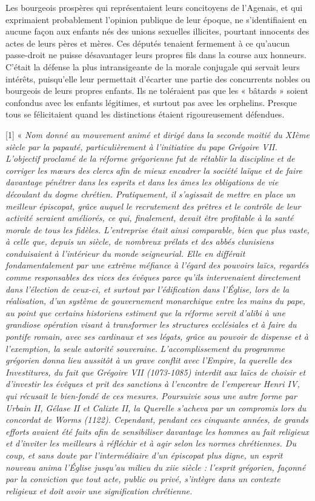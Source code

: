  Les bourgeois prospères qui représentaient leurs concitoyens de l'Agenais, et qui exprimaient probablement l'opinion publique de leur époque, ne s'identifiaient en aucune façon aux enfants nés des unions sexuelles illicites, pourtant innocents des actes de leurs pères et mères. Ces députés tenaient fermement à ce qu'aucun passe-droit ne puisse désavantager leurs propres fils dans la course aux honneurs. C'était la défense la plus intransigeante de la morale conjugale qui servait leurs intérêts, puisqu'elle leur permettait d'écarter une partie des concurrents nobles ou bourgeois de leurs propres enfants. Ils ne toléraient pas que les « bâtards » soient confondus avec les enfants légitimes, et surtout pas avec les orphelins. Presque tous se félicitaient quand les distinctions étaient rigoureusement défendues. 
 
[1] « \emph{Nom donné au mouvement animé et dirigé dans la seconde moitié du XIème siècle par la papauté, particulièrement à l'initiative du pape Grégoire VII. L'objectif proclamé de la réforme grégorienne fut de rétablir la discipline} \emph{et de corriger les mœurs des clercs} \emph{afin de} \emph{mieux encadrer la société laïque et de faire davantage pénétrer dans les esprits et dans les âmes les obligations de vie découlant du dogme chrétien. Pratiquement, il s'agissait de mettre en place un meilleur épiscopat, grâce auquel le recrutement des prêtres et le contrôle de leur activité seraient améliorés, ce qui, finalement, devait être profitable à la santé morale de tous les fidèles. L'entreprise était ainsi comparable, bien que plus vaste, à celle que, depuis un siècle, de nombreux prélats et des abbés clunisiens conduisaient à l'intérieur du monde seigneurial. Elle en différait fondamentalement par une extrême méfiance à l'égard des pouvoirs laïcs, regardés comme responsables des vices des évêques parce qu'ils intervenaient directement dans l'élection de ceux-ci, et surtout par l'édification dans l'Église, lors de la réalisation, d'un système de gouvernement monarchique entre les mains du pape, au point que certains historiens estiment que la réforme servit d'alibi à une grandiose opération visant à transformer les structures ecclésiales et à faire du pontife romain, avec ses cardinaux et ses légats, grâce au pouvoir de dispense et à l'exemption, la seule autorité souveraine.}
\emph{L'accomplissement du programme grégorien donna lieu aussitôt à un grave conflit avec l'Empire, la querelle des Investitures, du fait que Grégoire VII (1073-1085) interdit aux laïcs de choisir et d'investir les évêques et prit des sanctions à l'encontre de l'empereur Henri IV, qui récusait le bien-fondé de ces mesures. Poursuivie sous une autre forme par Urbain II, Gélase II et Calixte II, la Querelle s'acheva par un compromis lors du concordat de Worms (1122). Cependant, pendant ces cinquante années, de grands efforts avaient été faits afin de sensibiliser davantage les hommes au fait religieux et d'inviter les meilleurs à réfléchir et à agir selon les normes chrétiennes. Du coup, et sans doute par l'intermédiaire d'un épiscopat plus digne, un esprit nouveau anima l'Église jusqu'au milieu du xiie siècle : l'esprit grégorien, façonné par la conviction que tout acte, public ou privé, s'intègre dans un contexte religieux et doit avoir une signification chrétienne.}
